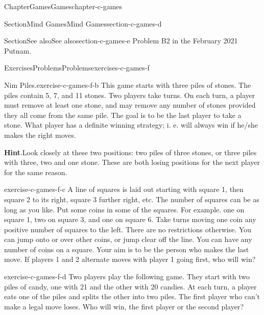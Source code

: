 \documentclass[oneside,10pt,]{book}
\newcommand{\blocktitlefont}{\relax}
\numberwithin{equation}{section}
\begin{document}
\begin{chapterptx}{Chapter}{Games}{}{Games}{}{}{chapter-c-games}
\begin{sectionptx}{Section}{Mind Games}{}{Mind Games}{}{}{section-c-games-d}
\end{sectionptx}
%
%
\typeout{************************************************}
\typeout{************************************************}
%
\begin{sectionptx}{Section}{See also}{}{See also}{}{}{section-c-games-e}
Problem B2 in the February 2021 Putnam.%
\end{sectionptx}
%
%
\typeout{************************************************}
\typeout{************************************************}
%
\begin{exercises-section}{Exercises}{Problems}{}{Problems}{}{}{exercises-c-games-f}
\begin{divisionexercise}{1}{Nim Piles.}{}{exercise-c-games-f-b}%
This game starts with three piles of stones. The piles contain 5, 7, and 11 stones. Two players take turns. On each turn, a player must remove at least one stone, and may remove any number of stones provided they all come from the same pile. The goal is to be the last player to take a stone. What player has a definite winning strategy; i. e. will always win if he\slash{}she makes the right moves.%
\par\smallskip%
\noindent\textbf{\blocktitlefont Hint}.\hypertarget{hint-c-games-f-b-c}{}\quad{}Look closely at these two positions: two piles of three stones, or three piles with three, two and one stone.   These are both losing positions for the next player for the same reason.%
\end{divisionexercise}%
\begin{divisionexercise}{2}{}{}{exercise-c-games-f-c}%
A line of squares is laid out starting with square 1, then square 2 to its right, square 3 further right, etc.  The number of squares can be as long as you like. Put some coins in some of the squares.  For example.  one on square 1, two on square 3, and one on square 6.  Take turns moving one coin any positive number of squares to the left. There are no restrictions otherwise. You can jump onto or over other coins, or jump clear off the line. You can have any number of coins on a square. Your aim is to be the person who makes the last move.   If players 1 and 2 alternate moves with player 1 going first, who will win?%
\end{divisionexercise}%
\begin{divisionexercise}{3}{}{}{exercise-c-games-f-d}%
Two players play the following game. They start with two piles of candy, one with 21 and the other with 20 candies. At each turn, a player eats one of the piles and splits the other into two piles. The first player who can't make a legal move loses. Who will win, the first player or the second player?%

\end{divisionexercise}
\end{exercises-section}
\end{chapterptx}
\end{document}
